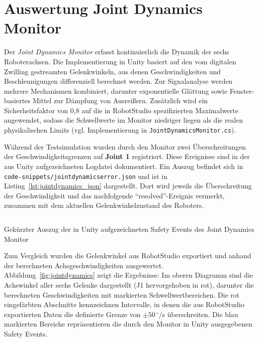 \section{Auswertung Joint Dynamics Monitor}
\label{sec:Analyse_Sicherheit}

Der \textit{Joint Dynamics Monitor} erfasst kontinuierlich die Dynamik der sechs Roboterachsen.
Die Implementierung in Unity basiert auf den vom digitalen Zwilling gestreamten Gelenkwinkeln,
aus denen Geschwindigkeiten und Beschleunigungen differenziell berechnet werden.
Zur Signalanalyse werden mehrere Mechanismen kombiniert, darunter exponentielle Glättung
sowie Fenster-basiertes Mittel zur Dämpfung von Ausreißern. Zusätzlich wird ein
Sicherheitsfaktor von 0{,}8 auf die in RobotStudio spezifizierten Maximalwerte angewendet,
sodass die Schwellwerte im Monitor niedriger liegen als die realen physikalischen Limits
(vgl. Implementierung in \texttt{JointDynamicsMonitor.cs}).

Während der Testsimulation wurden durch den Monitor zwei Überschreitungen der
Geschwindigkeitsgrenzen auf \textbf{Joint 1} registriert. Diese Ereignisse sind in der
aus Unity aufgezeichneten Logdatei dokumentiert. Ein Auszug befindet sich in
\texttt{code-snippets/jointdynamicserror.json} und ist in
Listing~\ref{lst:jointdynamics_json} dargestellt. Dort wird jeweils die Überschreitung der
Geschwindigkeit und das nachfolgende \enquote{resolved}-Ereignis vermerkt, zusammen mit dem
aktuellen Gelenkwinkelzustand des Roboters.

\begin{listing}[H]
	\centering
	\inputminted[fontsize=\footnotesize,breaklines]{json}{code-snippets/jointdynamicserror.json}
	\caption{Gekürzter Auszug der in Unity aufgezeichneten Safety Events des Joint Dynamics Monitor}
	\label{lst:jointdynamics_json}
\end{listing}

Zum Vergleich wurden die Gelenkwinkel aus RobotStudio exportiert und anhand der berechneten
Achsgeschwindigkeiten ausgewertet. Abbildung~\ref{fig:jointdynamics} zeigt die Ergebnisse:
Im oberen Diagramm sind die Achswinkel aller sechs Gelenke dargestellt (J1 hervorgehoben in rot),
darunter die berechneten Geschwindigkeiten mit markierten Schwellwertbereichen.
Die rot eingefärbten Abschnitte kennzeichnen Intervalle, in denen die aus RobotStudio
exportierten Daten die definierte Grenze von $\pm 50\,^\circ$/s überschreiten.
Die blau markierten Bereiche repräsentieren die durch den Monitor in Unity ausgegebenen
Safety Events.


